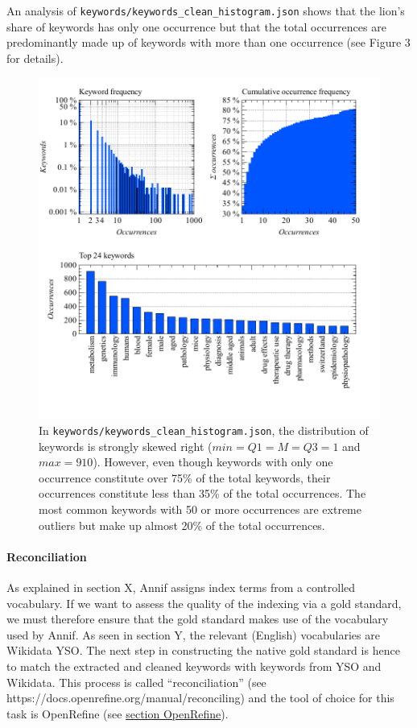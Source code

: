 An analysis of \texttt{keywords/keywords\_clean\_histogram.json} shows
that the lion's share of keywords has only one occurrence but that the
total occurrences are predominantly made up of keywords with more than
one occurrence (see Figure 3 for details).

\begin{figure}
\centering
\includegraphics{images/keywords_clean_histogram_abc.pdf}
\caption{In \texttt{keywords/keywords\_clean\_histogram.json}, the
distribution of keywords is strongly skewed right
(\(min = Q1 = M = Q3 = 1\) and \(max = 910\)). However, even though
keywords with only one occurrence constitute over 75\% of the total
keywords, their occurrences constitute less than 35\% of the total
occurrences. The most common keywords with 50 or more occurrences are
extreme outliers but make up almost 20\% of the total occurrences.}
\end{figure}

\hypertarget{reconciliation}{%
\paragraph{Reconciliation}\label{reconciliation}}

As explained in section X, Annif assigns index terms from a controlled
vocabulary. If we want to assess the quality of the indexing via a gold
standard, we must therefore ensure that the gold standard makes use of
the vocabulary used by Annif. As seen in section Y, the relevant
(English) vocabularies are Wikidata YSO. The next step in constructing
the native gold standard is hence to match the extracted and cleaned
keywords with keywords from YSO and Wikidata. This process is called
``reconciliation'' (see https://docs.openrefine.org/manual/reconciling)
and the tool of choice for this task is OpenRefine (see
\protect\hyperlink{openrefine}{section OpenRefine}).

